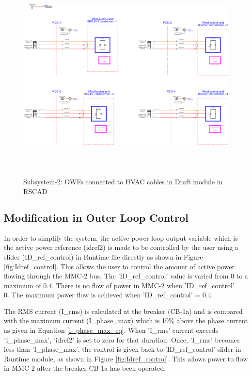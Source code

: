 \begin{figure}[H]
\centering
    \includegraphics[height = 11cm,width = \textwidth]{Diagrams/Appendix_C/MMC_2_RSCAD_Rep_2.pdf}
    \caption{Subsystem-2: OWFs connected to HVAC cables in Draft module in RSCAD}
    \label{fig:MMC_2_RSCAD_Rep_2}
\end{figure}

\subsection{Modification in Outer Loop Control}\label{modific_outer_loop}
In order to simplify the system, the active power loop output variable which is the active power reference (idref2) is made to be controlled by the user using a slider (ID\_ref\_control) in Runtime file directly as shown in Figure \ref{fig:Idref_control}. This allows the user to control the amount of active power flowing through the \gls{MMC}-2 bus. The 'ID\_ref\_control' value is varied from 0 to a maximum of 0.4. There is no flow of power in \gls{MMC}-2 when 'ID\_ref\_control' = 0. The maximum power flow is achieved when 'ID\_ref\_control' = 0.4. 

The RMS current (I\_rms) is calculated at the breaker (CB-1a) and is compared with the maximum current (I\_phase\_max) which is 10\% above the phase current as given in Equation \ref{i_phase_max_eq}. When 'I\_rms' current exceeds 'I\_phase\_max', 'idref2' is set to zero for that duration. Once, 'I\_rms' becomes less than 'I\_phase\_max', the control is given back to 'ID\_ref\_control' slider in Runtime module, as shown in Figure \ref{fig:Idref_control}. This allows power to flow in \gls{MMC}-2 after the breaker CB-1a has been operated.

